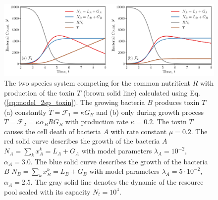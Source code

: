 \documentclass[10pt,A4paper]{article}
\begin{document}
\begin{figure}[H]
    \begin{center}
    \includegraphics[width=1.\textwidth]{Figures/pool_model_2pools_toxin.pdf}
    \caption{{\footnotesize The two species system competing for the common nutritient $R$ with production of the toxin $T$ (brown solid line) calculated using Eq. (\ref{eq:model_2sp_toxin}).
    The growing bacteria $B$ produces toxin $T$ (a) constantly $\dot{T} = \mathcal{F}_1 = \kappa G_B$ and (b) only during growth process $\dot{T} = \mathcal{F}_2 = \kappa \alpha_B R G_B$ with 
    production rate $\kappa=0.2$.
    The toxin $T$ causes the cell death of bacteria $A$ with rate constant $\mu = 0.2$.
    The red solid curve describes the growth of the bacteria $A$ $N_A = \sum_{k} x_A^k = L_A+G_A$ with model parameters $\lambda_A=10^{-2}$, $\alpha_A=3.0$.
    The blue solid curve describes the growth of the bacteria $B$ $N_B = \sum_{k} x_B^k = L_B+G_B$ with model parameters $\lambda_A=5\cdot 10^{-2}$, $\alpha_A=2.5$.
    The gray solid line denotes the dynamic of the resource pool scaled with its capacity $N_t=10^4$.}}
    \label{fig:2pool_2sp_toxin}
    \end{center}
\end{figure}
\end{document}
